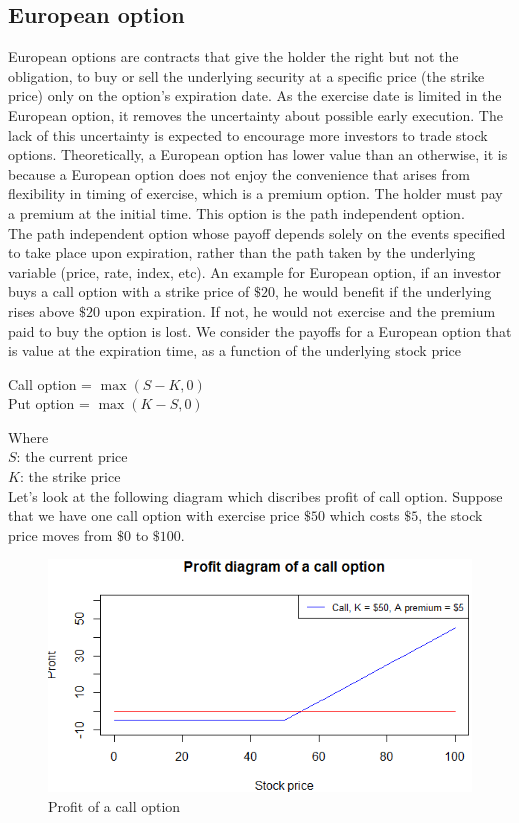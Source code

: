 	\subsection{European option}
	European options are contracts that give the holder the right but not the obligation, to buy or sell the underlying security at a specific price (the strike price) only on the option's expiration date. As the exercise date is limited in the European option, it removes the uncertainty about possible early execution. The lack of this uncertainty is expected to encourage more investors to trade stock options. Theoretically, a European option has lower value than an otherwise, it is because a European option does not enjoy the convenience that arises from flexibility in timing of exercise, which is a premium option. The holder must pay a premium at the initial time. This option is the path independent option. \\ [0.5cm]
	The path independent option whose payoff depends solely on the events specified to take place upon expiration, rather than the path taken by the underlying variable (price, rate, index, etc). An example for European option, if an investor buys a call option with a strike price of $\$20$, he would benefit if the underlying rises above $\$20$ upon expiration. If not, he would not exercise and the premium paid to buy the option is lost. We consider the payoffs for a European option that is value at the expiration time, as a function of the underlying stock price	
	\begin{center}
Call option = $\max(S-K,0)$\\
Put option = $\max(K-S,0)$\\
	\end{center}
Where\\
$S$: the current price\\
$K$: the strike price   \\[0.5cm]
Let's look at the following diagram which discribes profit of call option. Suppose that we have one call option with exercise price $\$50$ which costs $\$5$, the stock price moves from $\$0$ to $\$100$.  
\begin{figure}[htp]
	\begin{center}
		\includegraphics[scale=0.8]{Rplot02}
	\end{center}
	\label{refRplot02}
	\caption{Profit of a call option}
\end{figure}

